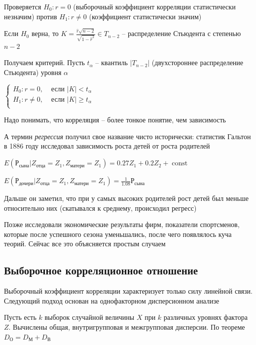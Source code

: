Проверяется $H_0 : r = 0$ (выборочный коэффициент корреляции статистически незначим) против $H_1 : r \neq 0$ (коэффициент статистически значим)

\begin{MyTheorem}
    Если $H_0$ верна, то $K = \frac{\hat r \sqrt{n - 2}}{\sqrt{1 - \hat r^2}} \in T_{n - 2}$ -- распределение Стьюдента с степенью $n - 2$ 
\end{MyTheorem}

Получаем критерий. Пусть $t_\alpha$ -- квантиль $|T_{n - 2}|$ (двухстороннее распределение Стьюдента) уровня $\alpha$

$\begin{cases}
    H_0 : r = 0, & \text{ если } |K| < t_\alpha \\
    H_1 : r \neq 0, & \text{ если } |K| \geq t_\alpha \\
\end{cases}$

Надо понимать, что корреляция -- более тонкое понятие, чем зависимость

А термин \textit{регрессия} получил свое название чисто исторически: статистик Гальтон в 1886 году 
исследовал зависимость роста детей от роста родителей

$E(\text{Р}_\text{сына} | Z_\text{отца} = Z_1, Z_\text{матери} = Z_1) = 0.27 Z_1 + 0.2 Z_2 + \operatorname{const}$

$E(\text{Р}_\text{дочери} | Z_\text{отца} = Z_1, Z_\text{матери} = Z_1) = \frac{1}{1.08} \text{Р}_\text{сына}$

Дальше он заметил, что при у самых высоких родителей рост детей был меньше относительно них (скатывался к среднему, происходил регресс)

Позже исследовали экономические результаты фирм, показатели спортсменов, которые после успешного сезона уменьшались, 
после чего появлялось куча теорий. Сейчас все это объясняется простым случаем

\subsection{Выборочное корреляционное отношение}

\hypertarget{selective_correlational_relation}{}

Выборочный коэффициент корреляции характеризует только силу линейной связи. Следующий подход основан на однофакторном дисперсионном анализе

Пусть есть $k$ выборок случайной величины $X$ при $k$ различных уровнях фактора $Z$. Вычислены общая, внутригрупповая и межгрупповая дисперсии. 
По теореме $D_\text{О} = D_\text{М} + D_\text{В}$

